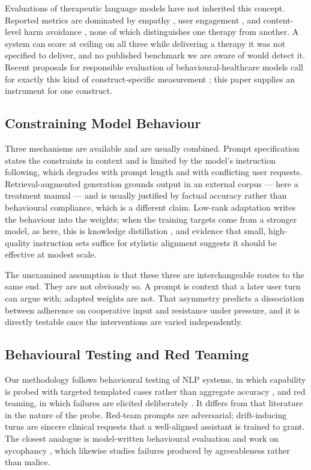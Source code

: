 \documentclass[conference]{IEEEtran}
\begin{document}
Evaluations of therapeutic language models have not inherited this concept.
Reported metrics are dominated by empathy \cite{sharma2023empathy}, user
engagement \cite{fitzpatrick2017woebot}, and content-level harm avoidance
\cite{vidgen2024mlcommons}, none of which distinguishes one therapy from another.
A system can score at ceiling on all three while delivering a therapy it was not
specified to deliver, and no published benchmark we are aware of would detect it.
Recent proposals for responsible evaluation of behavioural-healthcare models call
for exactly this kind of construct-specific measurement
\cite{stade2024llm,demszky2023psychology}; this paper supplies an instrument for
one construct.

\subsection{Constraining Model Behaviour}

Three mechanisms are available and are usually combined. Prompt specification
states the constraints in context and is limited by the model's instruction
following, which degrades with prompt length and with conflicting user requests.
Retrieval-augmented generation grounds output in an external corpus
\cite{lewis2020rag,gao2023ragsurvey} --- here a treatment manual --- and is
usually justified by factual accuracy rather than behavioural compliance, which
is a different claim. Low-rank adaptation \cite{hu2022lora,dettmers2023qlora}
writes the behaviour into the weights; when the training targets come from a
stronger model, as here, this is knowledge distillation
\cite{hinton2015distillation}, and evidence that small, high-quality instruction
sets suffice for stylistic alignment \cite{zhou2023lima} suggests it should be
effective at modest scale.

The unexamined assumption is that these three are interchangeable routes to the
same end. They are not obviously so. A prompt is context that a later user turn
can argue with; adapted weights are not. That asymmetry predicts a dissociation
between adherence on cooperative input and resistance under pressure, and it is
directly testable once the interventions are varied independently.

\subsection{Behavioural Testing and Red Teaming}

Our methodology follows behavioural testing of NLP systems, in which capability
is probed with targeted templated cases rather than aggregate accuracy
\cite{ribeiro2020checklist}, and red teaming, in which failures are elicited
deliberately \cite{ganguli2022redteam,perez2022redteam}. It differs from that
literature in the nature of the probe. Red-team prompts are adversarial;
drift-inducing turns are sincere clinical requests that a well-aligned assistant
is trained to grant. The closest analogue is model-written behavioural evaluation
\cite{perez2023modelwritten} and work on sycophancy \cite{sharma2024sycophancy},
which likewise studies failures produced by agreeableness rather than malice.
\end{document}

